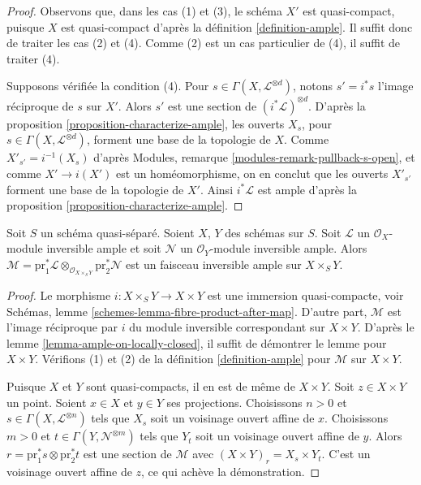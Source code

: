 \begin{proof}
Observons que, dans les cas (1) et (3), le schéma $X'$ est quasi-compact,
puisque $X$ est quasi-compact d'après la définition \ref{definition-ample}.
Il suffit donc de traiter les cas (2) et (4). Comme (2) est un cas particulier
de (4), il suffit de traiter (4).

\medskip\noindent
Supposons vérifiée la condition (4). Pour $s \in \Gamma(X, \mathcal{L}^{\otimes d})$,
notons $s' = i^*s$ l'image réciproque de $s$ sur $X'$. Alors
$s'$ est une section de $(i^*\mathcal{L})^{\otimes d}$. D'après la
proposition \ref{proposition-characterize-ample},
les ouverts $X_s$, pour $s \in \Gamma(X, \mathcal{L}^{\otimes d})$,
forment une base de la topologie de $X$. Comme $X'_{s'} = i^{-1}(X_s)$ d'après
Modules, remarque \ref{modules-remark-pullback-s-open},
et comme $X' \to i(X')$ est un homéomorphisme, on en conclut
que les ouverts $X'_{s'}$ forment une base de la topologie de $X'$. Ainsi
$i^*\mathcal{L}$ est ample d'après la
proposition \ref{proposition-characterize-ample}.
\end{proof}

\begin{lemma}
\label{lemma-ample-on-product}
Soit $S$ un schéma quasi-séparé. Soient $X$, $Y$ des schémas sur $S$.
Soit $\mathcal{L}$ un $\mathcal{O}_X$-module inversible ample
et soit $\mathcal{N}$ un $\mathcal{O}_Y$-module inversible ample.
Alors $\mathcal{M} = \text{pr}_1^*\mathcal{L}
\otimes_{\mathcal{O}_{X \times_S Y}} \text{pr}_2^*\mathcal{N}$
est un faisceau inversible ample sur $X \times_S Y$.
\end{lemma}

\begin{proof}
Le morphisme $i : X \times_S Y \to X \times Y$ est une immersion
quasi-compacte, voir Schémas, lemme \ref{schemes-lemma-fibre-product-after-map}.
D'autre part, $\mathcal{M}$ est l'image réciproque par
$i$ du module inversible correspondant sur $X \times Y$.
D'après le lemme \ref{lemma-ample-on-locally-closed}, il suffit de démontrer le
lemme pour $X \times Y$. Vérifions (1) et (2) de la
définition \ref{definition-ample} pour $\mathcal{M}$ sur $X \times Y$.

\medskip\noindent
Puisque $X$ et $Y$ sont quasi-compacts, il en est de même de $X \times Y$.
Soit $z \in X \times Y$ un point. Soient $x \in X$ et $y \in Y$
ses projections. Choisissons $n > 0$ et
$s \in \Gamma(X, \mathcal{L}^{\otimes n})$
tels que $X_s$ soit un voisinage ouvert affine de $x$.
Choisissons $m > 0$ et
$t \in \Gamma(Y, \mathcal{N}^{\otimes m})$
tels que $Y_t$ soit un voisinage ouvert affine de $y$.
Alors $r = \text{pr}_1^*s \otimes \text{pr}_2^*t$ est une section
de $\mathcal{M}$ avec $(X \times Y)_r = X_s \times Y_t$.
C'est un voisinage ouvert affine de $z$, ce qui achève la démonstration.
\end{proof}


